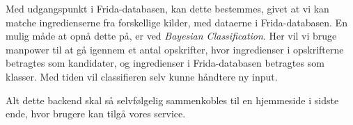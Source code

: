 \documentclass[a4paper,]{article}
\begin{document}
Med udgangspunkt i Frida-databasen, kan dette bestemmes, givet at vi
kan matche ingredienserne fra forskellige kilder, med dataerne i
Frida-databasen.  En mulig måde at opnå dette på, er ved
\textit{Bayesian Classification}.  Her vil vi bruge manpower til at gå
igennem et antal opskrifter, hvor ingredienser i opskrifterne
betragtes som kandidater, og ingredienser i Frida-databasen betragtes
som klasser.  Med tiden vil classifieren selv kunne håndtere ny input.

Alt dette backend skal så selvfølgelig sammenkobles til en hjemmeside i sidste ende, hvor brugere kan tilgå vores service.
\end{document}
